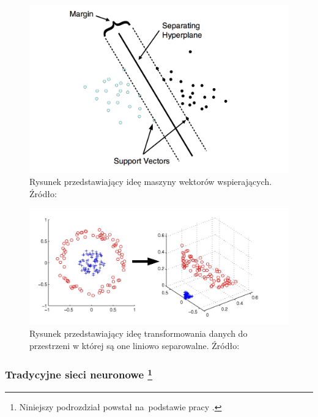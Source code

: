 \begin{figure}[ht!]
\centering
\includegraphics[scale=0.8]{res/svm1.png}
\caption[Caption for LOF]{Rysunek przedstawiający ideę maszyny wektorów wspierających. Źródło:\cite{svm2} \label{svmIdea}}
\end{figure} 

\begin{figure}[ht!]
\centering
\includegraphics[scale=0.6]{res/svm2.png}
\caption[Caption for LOF]{Rysunek przedstawiający ideę transformowania danych do przestrzeni w której są one liniowo separowalne. Źródło:\cite{svmKernel} \label{svmKernel}}
\end{figure} 

\subsubsection[Tradycyjne sieci neuronowe]{Tradycyjne sieci neuronowe \footnote{Niniejszy podrozdział powstał na~podstawie pracy \cite{tadeusiewicz}. }}

